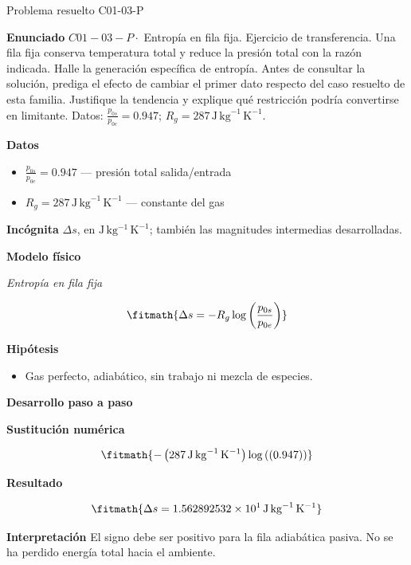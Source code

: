 \documentclass[10pt,openany]{book}
\begin{document}
\begin{studiumworked}{Problema resuelto C01-03-P}


\noindent\textbf{Enunciado}
\(C01-03-P \cdot\) Entropía en fila fija. Ejercicio de transferencia. Una fila fija conserva temperatura total y reduce la presión total con la razón indicada. Halle la generación específica de entropía. Antes de consultar la solución, prediga el efecto de cambiar el primer dato respecto del caso resuelto de esta familia. Justifique la tendencia y explique qué restricción podría convertirse en limitante. Datos: \(\frac{p_{0s}}{p_{0e}}=0.947\); \(R_g=287\, \mathrm{J}\,\mathrm{kg}^{-1}\,\mathrm{K}^{-1}\).

\noindent\textbf{Datos}
\begin{itemize}
\item $\frac{p_{0s}}{p_{0e}} = 0.947$ — presión total salida/entrada
\item $R_g = 287\,\mathrm{J}\,\mathrm{kg}^{-1}\,\mathrm{K}^{-1}$ — constante del gas
\end{itemize}

\noindent\textbf{Incógnita}
$\Delta s$, en $\mathrm{J\,kg^{-1}\,K^{-1}}$; también las magnitudes intermedias desarrolladas.

\noindent\textbf{Modelo físico}

\noindent\textit{Entropía en fila fija}

\[
\fitmath{\Delta s=- R_g \log{\left(\frac{p_{0s}}{p_{0e}} \right)}}
\]

\noindent\textbf{Hipótesis}
\begin{itemize}
\item Gas perfecto, adiabático, sin trabajo ni mezcla de especies.
\end{itemize}

\noindent\textbf{Desarrollo paso a paso}



\noindent\textbf{Sustitución numérica}

\[
\fitmath{- \left(287\,\mathrm{J}\,\mathrm{kg}^{-1}\,\mathrm{K}^{-1}\right) \log{\left(\left(0.947\right) \right)}}
\]

\noindent\textbf{Resultado}

\[
\fitmath{\Delta s=1.562892532\times10^{1}\,\mathrm{J}\,\mathrm{kg}^{-1}\,\mathrm{K}^{-1}}
\]

\noindent\textbf{Interpretación}
El signo debe ser positivo para la fila adiabática pasiva. No se ha perdido energía total hacia el ambiente.


\end{studiumworked}
\end{document}
